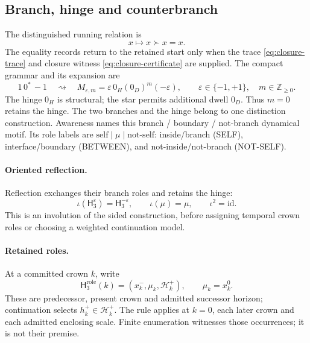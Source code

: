 \subsection{Branch, hinge and counterbranch}
\label{sec:cut-running-fractal-tesseract}
\label{subsec:null-symmetry}
\label{subsec:cut-running}
The distinguished running relation is
\label{subsec:local-cut-running-form}
\begin{equation}
x\longmapsto x\succ x=x.
\label{eq:cut-running-form}
\end{equation}
The equality records return to the retained start only when the trace
\eqref{eq:closure-trace} and closure witness \eqref{eq:closure-certificate}
are supplied. The compact grammar and its expansion are
\label{subsec:branch-hinge-branch}
\begin{equation}
1\,0^*\,-1
\quad\rightsquigarrow\quad
M_{\varepsilon,m}=\varepsilon\,0_H(0_D)^m(-\varepsilon),
\qquad \varepsilon\in\{-1,+1\},\quad m\in\mathbb Z_{\ge0}.
\label{eq:hinge-grammar}
\end{equation}
The hinge \(0_H\) is structural; the star permits additional dwell \(0_D\).
Thus \(m=0\) retains the hinge. The two branches and the hinge belong to one
distinction construction. Awareness names this branch / boundary / not-branch
dynamical motif. Its role labels are
\(\mathrm{self}\mid\mu\mid\text{not-self}\): inside/branch (SELF),
interface/boundary (BETWEEN), and not-inside/not-branch (NOT-SELF).

\paragraph{Oriented reflection.}
Reflection exchanges their branch roles and retains the hinge:
\begin{equation}
\iota(\mathsf H_3^{\varepsilon})=\mathsf H_3^{-\varepsilon},\qquad
\iota(\mu)=\mu,\qquad\iota^2=\mathrm{id}.
\label{eq:hinge-reflection-involution}
\end{equation}
This is an involution of the sided construction, before assigning temporal
crown roles or choosing a weighted continuation model.

\paragraph{Retained roles.}
\label{subsec:hinge-triad}
At a committed crown \(k\), write
\begin{equation}
\mathsf H_3^{\mathrm{role}}(k)=(x_k^-,\mu_k,\mathcal H_k^+),\qquad \mu_k=x_k^0.
\label{eq:hinge-triad}
\end{equation}
These are predecessor, present crown and admitted successor horizon;
continuation selects \(h_k^+\in\mathcal H_k^+\). The rule applies at \(k=0\),
each later crown and each admitted enclosing scale. Finite enumeration witnesses
those occurrences; it is not their premise.

